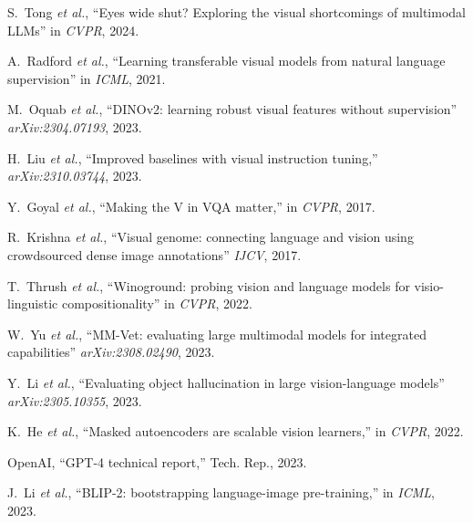 \documentclass[11pt]{article}
\begin{document}
\begin{small}
\begin{thebibliography}{9}
    \setlength{\itemsep}{0.1em}  
    \setlength{\parskip}{0pt}     

        S.~Tong \emph{et al.},
        ``Eyes wide shut? Exploring the visual shortcomings of multimodal LLMs''
        in \emph{CVPR}, 2024.
        
        A.~Radford \emph{et al.},
        ``Learning transferable visual models from natural language supervision''
        in \emph{ICML}, 2021.

        M.~Oquab \emph{et al.},
        ``DINOv2: learning robust visual features without supervision''
        \emph{arXiv:2304.07193}, 2023.

        H.~Liu \emph{et al.},
        ``Improved baselines with visual instruction tuning,''
        \emph{arXiv:2310.03744}, 2023.

        Y.~Goyal \emph{et al.},
        ``Making the V in VQA matter,''
        in \emph{CVPR}, 2017.

        R.~Krishna \emph{et al.},
        ``Visual genome: connecting language and vision using crowdsourced dense image annotations''
        \emph{IJCV}, 2017.

        T.~Thrush \emph{et al.},
        ``Winoground: probing vision and language models for visio-linguistic compositionality''
        in \emph{CVPR}, 2022.

        W.~Yu \emph{et al.},
        ``MM-Vet: evaluating large multimodal models for integrated capabilities''
        \emph{arXiv:2308.02490}, 2023.

        Y.~Li \emph{et al.},
        ``Evaluating object hallucination in large vision-language models''
        \emph{arXiv:2305.10355}, 2023.
            
        K.~He \emph{et al.},
        ``Masked autoencoders are scalable vision learners,''
        in \emph{CVPR}, 2022.
        
        OpenAI,
        ``GPT-4 technical report,''
        Tech. Rep., 2023.
        
        J.~Li \emph{et al.},
        ``BLIP-2: bootstrapping language-image pre-training,''
        in \emph{ICML}, 2023.
        
        
\end{thebibliography}
\end{small}
    
\end{document}
